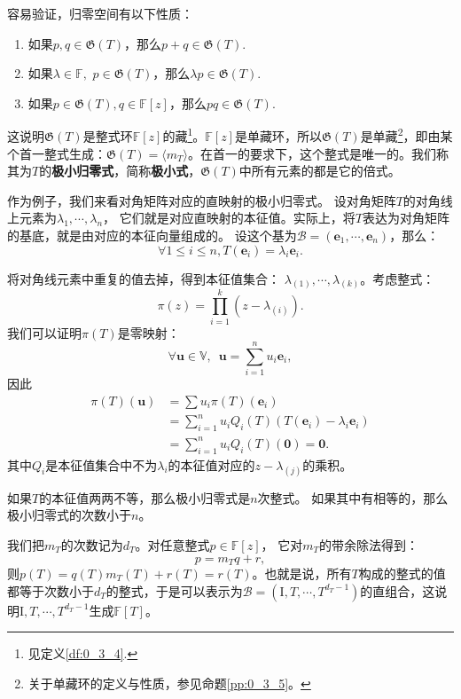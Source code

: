 \documentclass[12pt,UTF8,fontset=none]{ctexbook}
\begin{document}
容易验证，归零空间有以下性质：
\begin{enumerate}
    \item 如果$p, q \in \mathfrak{G}(T)$，那么$p + q \in \mathfrak{G}(T).$
    \item 如果$\lambda \in \mathbb{F}, \,\, p \in \mathfrak{G}(T)$，那么$\lambda p \in \mathfrak{G}(T).$
    \item 如果$p \in \mathfrak{G}(T), q \in \mathbb{F}[z]$，那么$pq \in \mathfrak{G}(T).$
\end{enumerate}
这说明$\mathfrak{G}(T)$是整式环$\mathbb{F}[z]$的藏\footnote{见定义\ref{df:0_3_4}.}。$\mathbb{F}[z]$是单藏环，所以$\mathfrak{G}(T)$是单藏\footnote{关于单藏环的定义与性质，参见命题\ref{pp:0_3_5}。}，即由某个首一整式生成：$\mathfrak{G}(T) = \langle m_T \rangle$。在首一的要求下，这个整式是唯一的。我们称其为$T$的\textbf{极小归零式}，简称\textbf{极小式}，$\mathfrak{G}(T)$中所有元素的都是它的倍式。

作为例子，我们来看对角矩阵对应的直映射的极小归零式。
设对角矩阵$T$的对角线上元素为$\lambda_1, \cdots , \lambda_n$，
它们就是对应直映射的本征值。实际上，将$T$表达为对角矩阵的基底，就是由对应的本征向量组成的。
设这个基为$\mathcal{B} = (\mathbf{e}_1, \cdots, \mathbf{e}_n)$，那么：
$$ \forall 1 \leqslant i \leqslant n, T(\mathbf{e}_i) = \lambda_i \mathbf{e}_i. $$

将对角线元素中重复的值去掉，得到本征值集合：
$\lambda_{(1)}, \cdots , \lambda_{(k)}$。考虑整式：
$$ \pi(z) = \prod_{i=1}^k (z - \lambda_{(i)}).$$
我们可以证明$\pi(T)$是零映射：
$$ \forall \mathbf{u} \in \mathbb{V}, \,\,\, \mathbf{u} = \sum_{i=1}^n u_i \mathbf{e}_i, $$
因此
\begin{align*}
     \pi(T)(\mathbf{u}) &= \sum u_i \pi(T) (\mathbf{e}_i)  \\
     &= \sum_{i=1}^n u_i Q_i(T) (T(\mathbf{e}_i) - \lambda_i \mathbf{e}_i)  \\
     &= \sum_{i=1}^n u_i Q_i(T) (\mathbf{0}) = \mathbf{0}.  
\end{align*}
其中$Q_i$是本征值集合中不为$\lambda_i$的本征值对应的$z - \lambda_{(j)}$的乘积。

如果$T$的本征值两两不等，那么极小归零式是$n$次整式。
如果其中有相等的，那么极小归零式的次数小于$n$。

我们把$m_T$的次数记为$d_T$。对任意整式$p\in\mathbb{F}[z]$，
它对$m_T$的带余除法得到：
$$p = m_T q + r,$$
则$p(T) = q(T)m_T(T) + r(T) = r(T)$。也就是说，所有$T$构成的整式的值都等于次数小于$d_T$的整式，于是可以表示为$\mathcal{B} = (\mathrm{I}, T, \cdots , T^{d_T - 1})$的直组合，这说明$\mathrm{I}, T, \cdots , T^{d_T - 1}$生成$\mathbb{F}[T]$。
\end{document}
